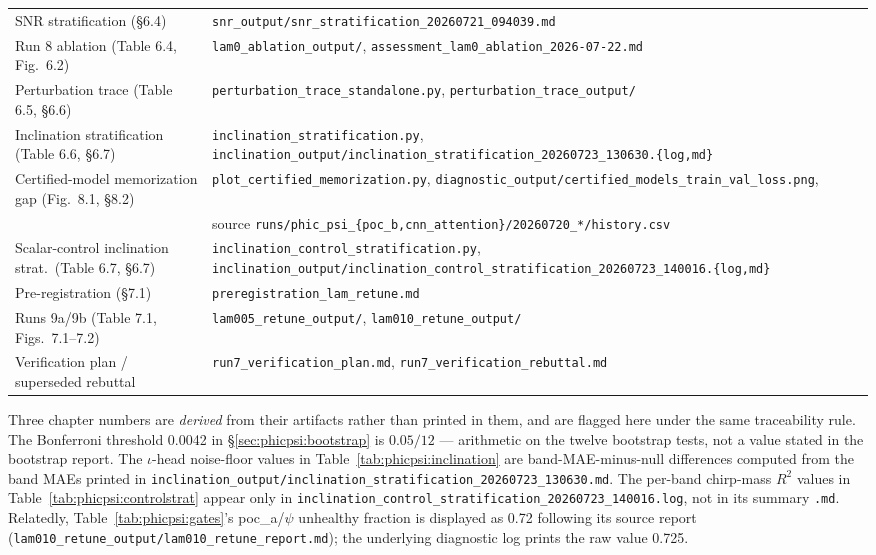 \begin{table}[tbp]
{\begin{tabular}{@{}ll@{}}
        SNR stratification (\S6.4)                         & \texttt{snr\_output/snr\_stratification\_20260721\_094039.md} \\
        Run 8 ablation (Table 6.4, Fig.~6.2)               & \texttt{lam0\_ablation\_output/}, \texttt{assessment\_lam0\_ablation\_2026-07-22.md} \\
        Perturbation trace (Table 6.5, \S6.6)              & \texttt{perturbation\_trace\_standalone.py}, \texttt{perturbation\_trace\_output/} \\
        Inclination stratification (Table 6.6, \S6.7)      & \texttt{inclination\_stratification.py}, \texttt{inclination\_output/inclination\_stratification\_20260723\_130630.\{log,md\}} \\
        Certified-model memorization gap (Fig.~8.1, \S8.2) & \texttt{plot\_certified\_memorization.py}, \texttt{diagnostic\_output/certified\_models\_train\_val\_loss.png}, \\
                                                           & \quad source \texttt{runs/phic\_psi\_\{poc\_b,cnn\_attention\}/20260720\_*/history.csv} \\
        Scalar-control inclination strat.\ (Table 6.7, \S6.7) & \texttt{inclination\_control\_stratification.py}, \texttt{inclination\_output/inclination\_control\_stratification\_20260723\_140016.\{log,md\}} \\
        Pre-registration (\S7.1)                           & \texttt{preregistration\_lam\_retune.md} \\
        Runs 9a/9b (Table 7.1, Figs.~7.1--7.2)             & \texttt{lam005\_retune\_output/}, \texttt{lam010\_retune\_output/} \\
        Verification plan / superseded rebuttal            & \texttt{run7\_verification\_plan.md}, \texttt{run7\_verification\_rebuttal.md} \\
        \bottomrule
    \end{tabular}
    }
\end{table}

Three chapter numbers are \emph{derived} from their artifacts rather than printed in them, and are flagged here under the same traceability rule.
The Bonferroni threshold 0.0042 in \S\ref{sec:phicpsi:bootstrap} is $0.05/12$ --- arithmetic on the twelve bootstrap tests, not a value stated in the bootstrap report.
The $\iota$-head noise-floor values in Table~\ref{tab:phicpsi:inclination} are band-MAE-minus-null differences computed from the band MAEs printed in \texttt{inclination\_output/inclination\_stratification\_20260723\_130630.md}.
The per-band chirp-mass $R^2$ values in Table~\ref{tab:phicpsi:controlstrat} appear only in \texttt{inclination\_control\_stratification\_20260723\_140016.log}, not in its summary \texttt{.md}.
Relatedly, Table~\ref{tab:phicpsi:gates}'s poc\_a/$\psi$ unhealthy fraction is displayed as 0.72 following its source report (\texttt{lam010\_retune\_output/lam010\_retune\_report.md}); the underlying diagnostic log prints the raw value 0.725.

